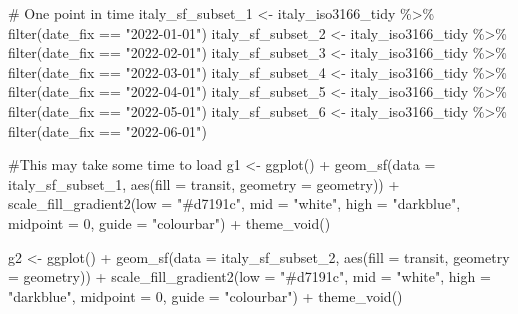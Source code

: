 \documentclass[
  letterpaper,
  DIV=11,
  numbers=noendperiod]{scrreprt}
\newenvironment{Shaded}{\begin{snugshade}}{\end{snugshade}}
\newcommand{\AttributeTok}[1]{\textcolor[rgb]{0.40,0.45,0.13}{#1}}
\newcommand{\CommentTok}[1]{\textcolor[rgb]{0.37,0.37,0.37}{#1}}
\newcommand{\DecValTok}[1]{\textcolor[rgb]{0.68,0.00,0.00}{#1}}
\newcommand{\FunctionTok}[1]{\textcolor[rgb]{0.28,0.35,0.67}{#1}}
\newcommand{\NormalTok}[1]{\textcolor[rgb]{0.00,0.23,0.31}{#1}}
\newcommand{\OtherTok}[1]{\textcolor[rgb]{0.00,0.23,0.31}{#1}}
\newcommand{\SpecialCharTok}[1]{\textcolor[rgb]{0.37,0.37,0.37}{#1}}
\newcommand{\StringTok}[1]{\textcolor[rgb]{0.13,0.47,0.30}{#1}}
\begin{document}
\begin{Shaded}
\begin{Highlighting}[]
\CommentTok{\# One point in time}
\NormalTok{italy\_sf\_subset\_1 }\OtherTok{\textless{}{-}}\NormalTok{ italy\_iso3166\_tidy }\SpecialCharTok{\%\textgreater{}\%} \FunctionTok{filter}\NormalTok{(date\_fix }\SpecialCharTok{==} \StringTok{"2022{-}01{-}01"}\NormalTok{)}
\NormalTok{italy\_sf\_subset\_2 }\OtherTok{\textless{}{-}}\NormalTok{ italy\_iso3166\_tidy }\SpecialCharTok{\%\textgreater{}\%} \FunctionTok{filter}\NormalTok{(date\_fix }\SpecialCharTok{==} \StringTok{"2022{-}02{-}01"}\NormalTok{)}
\NormalTok{italy\_sf\_subset\_3 }\OtherTok{\textless{}{-}}\NormalTok{ italy\_iso3166\_tidy }\SpecialCharTok{\%\textgreater{}\%} \FunctionTok{filter}\NormalTok{(date\_fix }\SpecialCharTok{==} \StringTok{"2022{-}03{-}01"}\NormalTok{)}
\NormalTok{italy\_sf\_subset\_4 }\OtherTok{\textless{}{-}}\NormalTok{ italy\_iso3166\_tidy }\SpecialCharTok{\%\textgreater{}\%} \FunctionTok{filter}\NormalTok{(date\_fix }\SpecialCharTok{==} \StringTok{"2022{-}04{-}01"}\NormalTok{)}
\NormalTok{italy\_sf\_subset\_5 }\OtherTok{\textless{}{-}}\NormalTok{ italy\_iso3166\_tidy }\SpecialCharTok{\%\textgreater{}\%} \FunctionTok{filter}\NormalTok{(date\_fix }\SpecialCharTok{==} \StringTok{"2022{-}05{-}01"}\NormalTok{)}
\NormalTok{italy\_sf\_subset\_6 }\OtherTok{\textless{}{-}}\NormalTok{ italy\_iso3166\_tidy }\SpecialCharTok{\%\textgreater{}\%} \FunctionTok{filter}\NormalTok{(date\_fix }\SpecialCharTok{==} \StringTok{"2022{-}06{-}01"}\NormalTok{)}

\CommentTok{\#This may take some time to load}
\NormalTok{g1 }\OtherTok{\textless{}{-}} \FunctionTok{ggplot}\NormalTok{() }\SpecialCharTok{+}
  \FunctionTok{geom\_sf}\NormalTok{(}\AttributeTok{data =}\NormalTok{ italy\_sf\_subset\_1, }\FunctionTok{aes}\NormalTok{(}\AttributeTok{fill =}\NormalTok{ transit, }\AttributeTok{geometry =}\NormalTok{ geometry)) }\SpecialCharTok{+}
  \FunctionTok{scale\_fill\_gradient2}\NormalTok{(}\AttributeTok{low =} \StringTok{"\#d7191c"}\NormalTok{, }\AttributeTok{mid =} \StringTok{"white"}\NormalTok{, }\AttributeTok{high =} \StringTok{"darkblue"}\NormalTok{, }
                      \AttributeTok{midpoint =} \DecValTok{0}\NormalTok{, }\AttributeTok{guide =} \StringTok{"colourbar"}\NormalTok{) }\SpecialCharTok{+}
  \FunctionTok{theme\_void}\NormalTok{()}

 
\NormalTok{g2 }\OtherTok{\textless{}{-}} \FunctionTok{ggplot}\NormalTok{() }\SpecialCharTok{+}
  \FunctionTok{geom\_sf}\NormalTok{(}\AttributeTok{data =}\NormalTok{ italy\_sf\_subset\_2, }\FunctionTok{aes}\NormalTok{(}\AttributeTok{fill =}\NormalTok{ transit, }\AttributeTok{geometry =}\NormalTok{ geometry)) }\SpecialCharTok{+}
    \FunctionTok{scale\_fill\_gradient2}\NormalTok{(}\AttributeTok{low =} \StringTok{"\#d7191c"}\NormalTok{, }\AttributeTok{mid =} \StringTok{"white"}\NormalTok{, }\AttributeTok{high =} \StringTok{"darkblue"}\NormalTok{, }
                      \AttributeTok{midpoint =} \DecValTok{0}\NormalTok{, }\AttributeTok{guide =} \StringTok{"colourbar"}\NormalTok{) }\SpecialCharTok{+}
  \FunctionTok{theme\_void}\NormalTok{()}


\end{Highlighting}
\end{Shaded}
\end{document}

